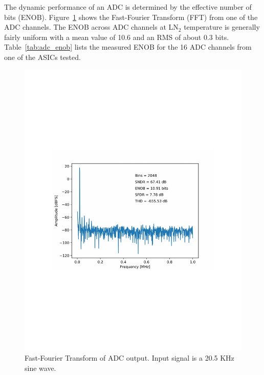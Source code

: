 \label{sec:4.3}


The dynamic performance of an ADC is determined by the effective number of bits (ENOB). Figure~\ref{fig:coldadc_fft} shows the Fast-Fourier Transform (FFT) from one of the ADC channels.  The ENOB across ADC channels at LN$_2$ temperature is generally fairly uniform with a mean value of 10.6 and an RMS of about 0.3 bits. Table~\ref{tab:adc_enob} lists the measured ENOB for the 16 ADC channels from one of the ASICs tested.
\begin{figure}[htb]
\centering
\begin{center}
\includegraphics[width=1.0\textwidth]{figures/fft_Sinusoid_20KHz_SE-SHA-ADC0_NomVREFPN_2M_v1.pdf}
\end{center}
\caption{Fast-Fourier Transform of ADC output. Input signal is a 20.5 KHz sine wave.}
\label{fig:coldadc_fft}
\end{figure}

